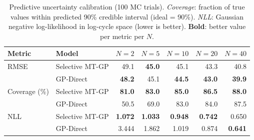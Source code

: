 \begin{table}[htbp]
\centering
\caption{Predictive uncertainty calibration (100 MC trials).
\textit{Coverage}: fraction of true values within predicted 90\% credible interval
(ideal = 90\%). \textit{NLL}: Gaussian negative log-likelihood in log-cycle space
(lower is better). \textbf{Bold}: better value per metric per $N$.}
\label{tab:calibration}
\setlength{\tabcolsep}{5pt}
\begin{tabular}{llrrrrr}
\toprule
\textbf{Metric} & \textbf{Model} & $N=2$ & $N=5$ & $N=10$ & $N=20$ & $N=40$ \\
\midrule
RMSE & Selective MT-GP & 49.1 & \textbf{45.0} & 45.1 & 43.3 & 40.8 \\
 & GP-Direct & \textbf{48.2} & 45.1 & \textbf{44.5} & \textbf{43.0} & \textbf{39.9} \\
\midrule
Coverage (\%) & Selective MT-GP & \textbf{81.0} & \textbf{83.0} & \textbf{85.0} & \textbf{86.5} & \textbf{88.0} \\
 & GP-Direct & 50.5 & 69.0 & 83.0 & 84.0 & 87.5 \\
\midrule
NLL & Selective MT-GP & \textbf{1.072} & \textbf{1.033} & \textbf{0.948} & \textbf{0.742} & 0.650 \\
 & GP-Direct & 3.444 & 1.862 & 1.019 & 0.874 & \textbf{0.641} \\
\bottomrule
\end{tabular}
\end{table}